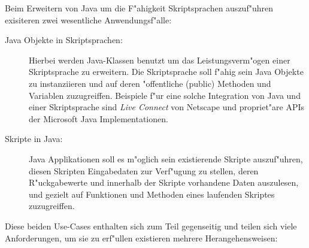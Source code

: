 Beim Erweitern von Java um die F"ahigkeit Skriptsprachen auszuf"uhren exisiteren zwei wesentliche Anwendungsf"alle:
\begin{description}
\item[Java Objekte in Skriptsprachen:]
Hierbei werden Java-Klassen benutzt um das Leistungsverm"ogen einer Skriptsprache zu erweitern. Die Skriptsprache
soll f"ahig sein Java Objekte zu instanziieren und auf deren "offentliche (public) Methoden und Variablen 
zuzugreiffen. Beispiele f"ur eine solche Integration von Java und einer Skriptsprache sind \emph{Live Connect} von
Netscape und propriet"are APIs der Microsoft Java Implementationen.
\item[Skripte in Java:]
Java Applikationen soll es m"oglich sein existierende Skripte auszuf"uhren, diesen Skripten Eingabedaten
zur Verf"ugung zu stellen, deren R"uckgabewerte und innerhalb der Skripte vorhandene Daten auszulesen, 
und gezielt auf Funktionen und Methoden eines laufenden Skriptes zuzugreiffen.
\end{description}
Diese beiden Use-Cases enthalten sich zum Teil gegenseitig und teilen sich viele Anforderungen, um sie
zu erf"ullen existieren mehrere Herangehensweisen:
